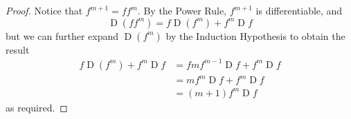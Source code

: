 \documentclass[letterpaper,11pt]{article}
\DeclareMathOperator{\D}{D}
\begin{document}
\begin{enumerate}
\begin{proof}
            Notice that $f^{m+1} = f f^m$. By the Power Rule, $f^{m+1}$ is
            differentiable, and
            \begin{equation*}
                \D{(f f^m)} = f \D{(f^m)} + f^m \D{f}
            \end{equation*}
            but we can further expand $\D{(f^m)}$ by the Induction Hypothesis
            to obtain the result
            \begin{align*}
                f \D{(f^m)} + f^m \D{f}
                &= f m f^{m-1} \D{f} + f^m \D{f} \\
                &= m f^m \D{f} + f^m \D{f} \\
                &= (m + 1) f^m \D{f}
            \end{align*}
            as required.
        \end{proof}
\end{enumerate}
\end{document}
